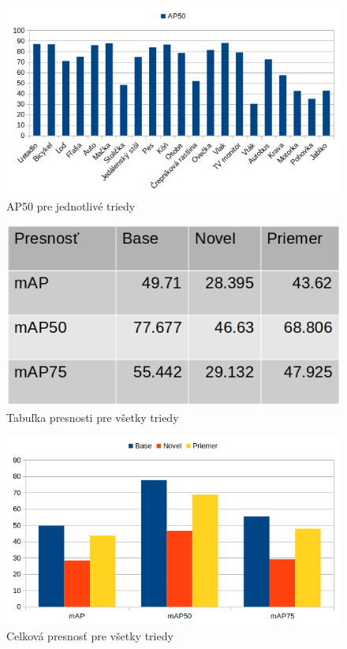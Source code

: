 \begin{figure}[H]
\includegraphics[width=\textwidth]{images/5_shot_classes_AP50.png}
\centering
\caption{AP50 pre jednotlivé triedy}
\label{fig:image28}
\end{figure}

\begin{figure}[H]
\includegraphics[width=\textwidth]{images/5shot_table_meanAP.png}
\centering
\caption{Tabuľka presnosti pre všetky triedy}
\label{fig:image29}
\end{figure}

\begin{figure}[H]
\includegraphics[width=\textwidth]{images/5_shot_meanAP.png}
\centering
\caption{Celková presnosť pre všetky triedy}
\label{fig:image30}
\end{figure}

